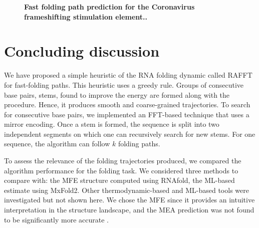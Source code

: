 \documentclass[a4paper,12pt]{article}
\begin{document}
{{\begin{figure}[!h]
  \caption{\textbf{Fast folding path prediction for the Coronavirus frameshifting stimulation element.\label{folding_dynamics}.}}
\end{figure}

\clearpage
\section{Concluding discussion}
\label{sec:org0267d44}
We have proposed a simple heuristic of the RNA folding dynamic called RAFFT for
fast-folding paths. This heuristic uses a greedy rule. Groups of consecutive
base pairs, stems, found to improve the energy are formed along with the
procedure. Hence, it produces smooth and coarse-grained trajectories. To search
for consecutive base pairs, we implemented an FFT-based technique that uses a
mirror encoding. Once a stem is formed, the sequence is split into two
independent segments on which one can recursively search for new stems. For one
sequence, the algorithm can follow \(k\) folding paths.

To assess the relevance of the folding trajectories produced, we compared the
algorithm performance for the folding task. We considered three methods to
compare with: the MFE structure computed using RNAfold, the ML-based estimate
using MxFold2. Other thermodynamic-based and ML-based tools were investigated
but not shown here. We chose the MFE since it provides an intuitive
interpretation in the structure landscape, and the MEA prediction was not found
to be significantly more accurate \cite{mathews19_how_to_bench_rna_secon}.

}}
\end{document}
